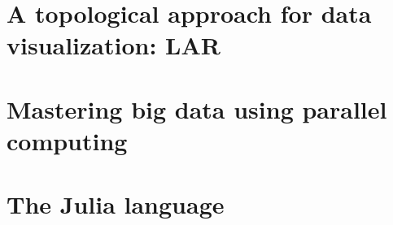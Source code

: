 
\chapter{A topological approach for data visualization: LAR}\label{Chapter21} %
\thispagestyle{empty}

\chapter{Mastering big data using parallel computing}\label{Chapter22} %
\thispagestyle{empty}

\chapter{The Julia language}\label{Chapter23} %
\thispagestyle{empty}
